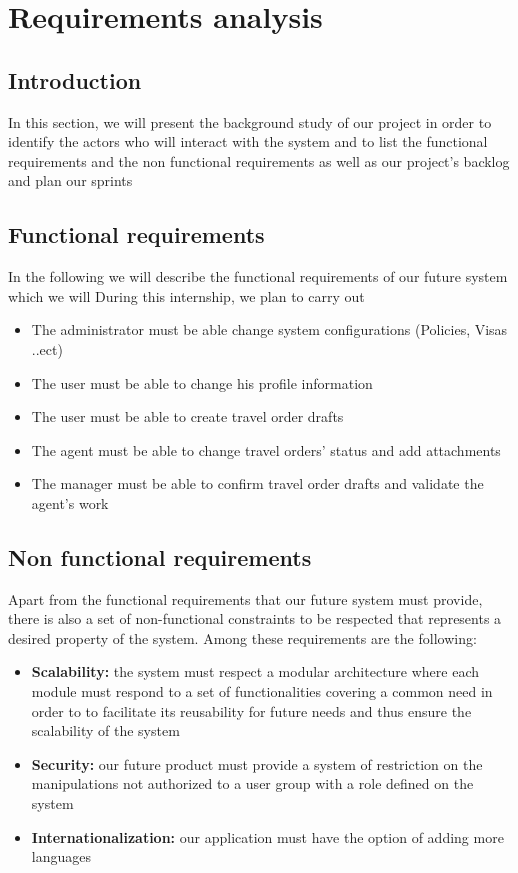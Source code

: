 \chapter{Requirements analysis}
\section*{Introduction}
In this section, we will present the background study of our project in order to identify the
actors who will interact with the system and to list the functional requirements and the non 
functional requirements as well as  our project's backlog and plan our sprints 

\section{Functional requirements}
In the following we will describe the functional requirements of our future system which we will
During this internship, we plan to carry out 
\begin{itemize}
    \item {} The administrator must be able change system configurations (Policies, Visas ..ect)
    \item {} The user must be able to change his profile information
    \item {} The user must be able to create travel order drafts
    \item {} The agent must be able to change travel orders' status and add attachments 
    \item {}The manager must be able to confirm travel order drafts and validate the agent's work
\end{itemize}

\section{Non functional requirements}
Apart from the functional requirements that our future system must provide, there is also a
set of non-functional constraints to be respected that represents a desired property of the
system.
Among these requirements are the following: 
\begin{itemize}
\item \textbf{Scalability:} the system must respect a modular architecture where each module
must respond to a set of functionalities covering a common need in order to
to facilitate its reusability for future needs and thus ensure the scalability of the
system
\item \textbf{Security:} our future product must provide a system of restriction on the
manipulations not authorized to a user group with a role defined on the
system
\item \textbf{Internationalization:} our application must have the option of adding more languages
\end{itemize}
